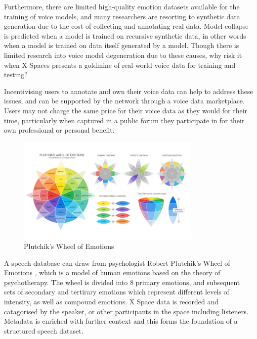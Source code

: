 \documentclass[11pt,a4paper]{article}
\begin{document}
Furthermore, there are limited high-quality emotion datasets available for the training of voice models, and many researchers are resorting to synthetic data generation due to the cost of collecting and annotating real data.
Model collapse is predicted when a model is trained on recursive synthetic data, in other words when a model is trained on data itself generated by a model.
Though there is limited research into voice model degeneration due to these causes, why risk it when X Spaces presents a goldmine of real-world voice data for training and testing?

Incentivising users to annotate and own their voice data can help to address these issues, and can be supported by the network through a voice data marketplace.
Users may not charge the same price for their voice data as they would for their time, particularly when captured in a public forum they participate in for their own professional or personal benefit.

\begin{figure}[H]
    \centering
    \includegraphics[width=0.8\textwidth]{wheel.png}
    \caption{Plutchik's Wheel of Emotions}
    \label{fig:emotion-wheel-png}
\end{figure}

A speech database can draw from psychologist Robert Plutchik's Wheel of Emotions \cite{plutchik1980general}, which is a model of human emotions based on the theory of psychotherapy.
The wheel is divided into 8 primary emotions, and subsequent sets of secondary and tertirary emotions which represent different levels of intensity, as well as compound emotions.
X Space data is recorded and catagorised by the speaker, or other participants in the space including listeners. Metadata is enriched with further context and this forms the foundation of a structured speech dataset.
\end{document}
